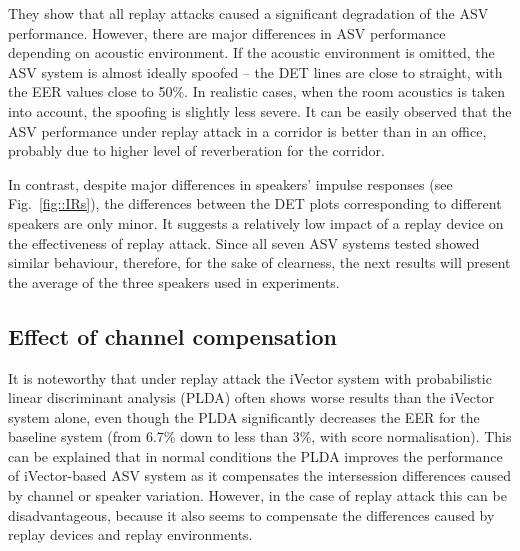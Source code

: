 They show that all replay attacks caused a significant degradation of the ASV performance. However, there are major differences in ASV performance depending on acoustic environment. If the acoustic environment is omitted, the ASV system is almost ideally spoofed -- the DET lines are close to straight, with the EER values close to 50\%. In realistic cases, when the room acoustics is taken into account, the spoofing is slightly less severe. It can be easily observed that the ASV performance under replay attack in a corridor is better than in an office, probably due to higher level of reverberation for the corridor.
















In contrast, despite major differences in speakers' impulse responses (see Fig.~\ref{fig::IRs}), the differences between the DET plots corresponding to different speakers are only minor. It suggests a relatively low impact of a replay device on the effectiveness of replay attack. Since all seven ASV systems tested showed similar behaviour, therefore, for the sake of clearness, the next results will present the average of the three speakers used in experiments.




\subsection{Effect of channel compensation}

It is noteworthy that under replay attack the iVector system with probabilistic linear discriminant analysis (PLDA) often shows worse results than the iVector system alone, even though the PLDA significantly decreases the EER for the baseline system (from 6.7\% down to less than 3\%, with score normalisation). This can be explained that in normal conditions the PLDA improves the performance of iVector-based ASV system as it compensates the intersession differences caused by channel or speaker variation. However, in the case of replay attack this can be disadvantageous, because it also seems to compensate the differences caused by replay devices and replay environments.

